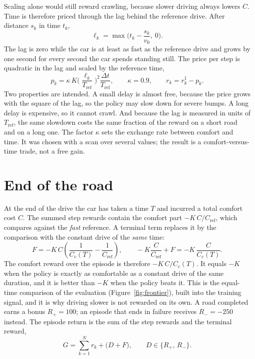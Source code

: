 \documentclass[11pt]{article}
\begin{document}
Scaling alone would still reward crawling, because slower driving always lowers $C$. Time is therefore priced through the lag behind the reference drive. After distance $s_k$ in time $t_k$,
\begin{equation}
\ell_k = \max\!\Big(t_k - \frac{s_k}{v_0},\ 0\Big).
\end{equation}
The lag is zero while the car is at least as fast as the reference drive and grows by one second for every second the car spends standing still. The price per step is quadratic in the lag and scaled by the reference time,
\begin{equation}
p_k = \kappa\, K \Big(\frac{\ell_k}{T_{\text{ref}}}\Big)^{2}\frac{\Delta t}{T_{\text{ref}}}, \qquad \kappa = 0.9, \qquad r_k = r^{1}_k - p_k .
\end{equation}
Two properties are intended. A small delay is almost free, because the price grows with the square of the lag, so the policy may slow down for severe bumps. A long delay is expensive, so it cannot crawl. And because the lag is measured in units of $T_{\text{ref}}$, the same slowdown costs the same fraction of the reward on a short road and on a long one. The factor $\kappa$ sets the exchange rate between comfort and time. It was chosen with a scan over several values; the result is a comfort-versus-time trade, not a free gain.

\section{End of the road}

At the end of the drive the car has taken a time $T$ and incurred a total comfort cost $C$. The summed step rewards contain the comfort part $-K\,C/C_{\text{ref}}$, which compares against the \emph{fast} reference. A terminal term replaces it by the comparison with the constant drive of the \emph{same} time:
\begin{equation}
F = -K\,C\left(\frac{1}{C_c(T)} - \frac{1}{C_{\text{ref}}}\right),
\qquad
-K\frac{C}{C_{\text{ref}}} + F = -K\,\frac{C}{C_c(T)} .
\end{equation}
The comfort reward over the episode is therefore $-K\,C/C_c(T)$. It equals $-K$ when the policy is exactly as comfortable as a constant drive of the same duration, and it is better than $-K$ when the policy beats it. This is the equal-time comparison of the evaluation (Figure~\ref{fig:frontier}), built into the training signal, and it is why driving slower is not rewarded on its own. A road completed earns a bonus $R_{+} = 100$; an episode that ends in failure receives $R_{-} = -250$ instead. The episode return is the sum of the step rewards and the terminal reward,
\begin{equation}
G = \sum_{k=1}^{N} r_k + \big(D + F\big), \qquad D \in \{R_{+},\, R_{-}\}.
\end{equation}
\end{document}
